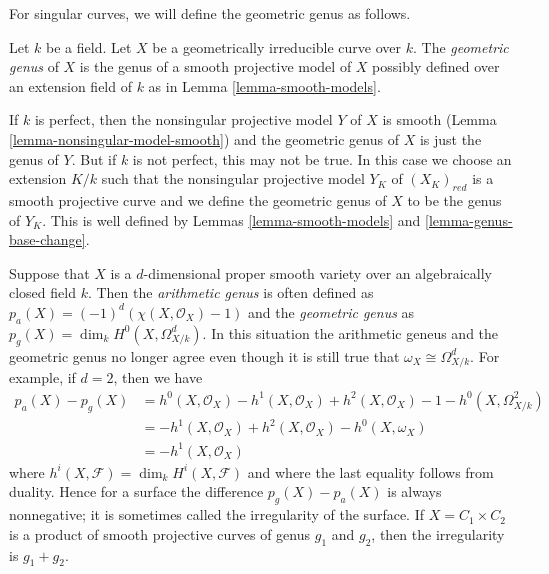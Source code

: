 \medskip\noindent
For singular curves, we will define the geometric genus as follows.

\begin{definition}
\label{definition-geometric-genus}
Let $k$ be a field. Let $X$ be a geometrically irreducible
curve over $k$. The {\it geometric genus} of $X$ is the genus
of a smooth projective model of $X$ possibly defined over
an extension field of $k$ as in
Lemma \ref{lemma-smooth-models}.
\end{definition}

\noindent
If $k$ is perfect, then the nonsingular projective model $Y$ of $X$
is smooth (Lemma \ref{lemma-nonsingular-model-smooth})
and the geometric genus of $X$ is just the genus of $Y$.
But if $k$ is not perfect, this may not be true.
In this case we choose an extension $K/k$ such that
the nonsingular projective model $Y_K$ of $(X_K)_{red}$ is
a smooth projective curve and we define the geometric genus
of $X$ to be the genus of $Y_K$. This is well defined by
Lemmas \ref{lemma-smooth-models} and \ref{lemma-genus-base-change}.

\begin{remark}
\label{remark-genus-higher-dimension}
Suppose that $X$ is a $d$-dimensional proper smooth variety over
an algebraically closed field $k$.
Then the {\it arithmetic genus} is often defined as
$p_a(X) = (-1)^d(\chi(X, \mathcal{O}_X) - 1)$ and the {\it geometric genus}
as $p_g(X) = \dim_k H^0(X, \Omega^d_{X/k})$. In this situation
the arithmetic geneus and the geometric genus no longer agree
even though it is still true that $\omega_X \cong \Omega_{X/k}^d$.
For example, if $d = 2$, then we have
\begin{align*}
p_a(X) - p_g(X) & =
h^0(X, \mathcal{O}_X) - h^1(X, \mathcal{O}_X) + h^2(X, \mathcal{O}_X) - 1
- h^0(X, \Omega^2_{X/k}) \\
& =
- h^1(X, \mathcal{O}_X) + h^2(X, \mathcal{O}_X) - h^0(X, \omega_X) \\
& =
- h^1(X, \mathcal{O}_X)
\end{align*}
where $h^i(X, \mathcal{F}) = \dim_k H^i(X, \mathcal{F})$ and
where the last equality follows from duality.
Hence for a surface the difference $p_g(X) - p_a(X)$ is always
nonnegative; it is sometimes called the irregularity of the surface.
If $X = C_1 \times C_2$ is a product of smooth projective curves of
genus $g_1$ and $g_2$, then the irregularity is $g_1 + g_2$.
\end{remark}






